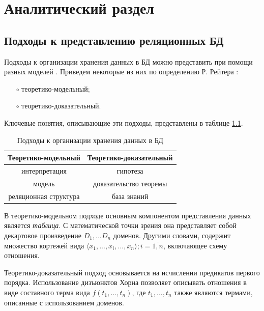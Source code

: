 \chapter{Аналитический раздел}

\section{Подходы к представлению реляционных БД}
\vspace{-0.5cm}
Подходы к организации хранения данных в БД можно представить при помощи разных моделей \cite{dbms_approaches}. Приведем некоторые из них по определению Р. Рейтера \cite{approach_reiter}:
\begin{itemize}
	\vspace{-0.3cm}
	\item[$\circ$] теоретико-модельный;
	\vspace{-0.4cm}
	\item[$\circ$] теоретико-доказательный.
\end{itemize}

Ключевые понятия, описывающие эти подходы, представлены в таблице \ref{table:dbms_approaches}.

\begin{table}[ht!]
	\centering
	\captionsetup{singlelinecheck = false, justification=raggedright}
	\caption{Подходы к организации хранения данных в БД}
	\label{table:dbms_approaches}
	\begin{tabular}{|c|c|}
		\hline
		\textbf{Теоретико-модельный} & \textbf{Теоретико-доказательный} \\ \hline
		интерпретация & гипотеза \\ \hline
		модель & доказательство теоремы \\ \hline
		реляционная структура & база знаний \\ \hline
	\end{tabular}
\end{table}

В теоретико-модельном подходе основным компонентом представления данных является \textit{таблица}. С математической точки зрения она представляет собой декартовое произведение $D_1,...D_n$ доменов. Другими словами, содержит множество кортежей вида $\langle x_1,...,x_i,...,x_n \rangle; i =\overline{1, n}$, включающее схему отношения.

Теоретико-доказательный подход основывается на исчислении предикатов первого порядка. Использование дизъюнктов Хорна позволяет описывать отношения в виде составного терма вида $f(t_1,...,t_n)$, где $t_1,...,t_n$ также являются термами, описанные с использованием доменов.

